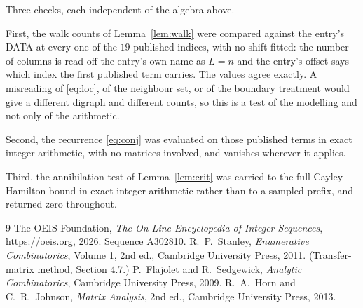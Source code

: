 \documentclass[11pt,a4paper]{article}
\theoremstyle{plain}
\theoremstyle{definition}
\begin{document}
Three checks, each independent of the algebra above.

First, the walk counts of Lemma~\ref{lem:walk} were compared against the entry's DATA at
every one of the $19$ published indices, with no shift fitted: the number of columns is
read off the entry's own name as $L=n$ and the entry's offset says which index the first
published term carries. The values agree exactly. A misreading of \eqref{eq:loc}, of the
neighbour set, or of the boundary treatment would give a different digraph and different
counts, so this is a test of the modelling and not only of the arithmetic.

Second, the recurrence \eqref{eq:conj} was evaluated on those published terms in exact
integer arithmetic, with no matrices involved, and vanishes wherever it applies.

Third, the annihilation test of Lemma~\ref{lem:crit} was carried to the full
Cayley--Hamilton bound in exact integer arithmetic rather than to a sampled prefix, and
returned zero throughout.

\begin{thebibliography}{9}
 The OEIS Foundation, \emph{The On-Line Encyclopedia of Integer
Sequences}, \url{https://oeis.org}, 2026. Sequence A302810.
 R.~P.~Stanley, \emph{Enumerative Combinatorics}, Volume 1, 2nd ed.,
Cambridge University Press, 2011. (Transfer-matrix method, Section 4.7.)
 P.~Flajolet and R.~Sedgewick, \emph{Analytic Combinatorics}, Cambridge
University Press, 2009.
 R.~A.~Horn and C.~R.~Johnson, \emph{Matrix Analysis}, 2nd ed., Cambridge
University Press, 2013.
\end{thebibliography}
\end{document}
